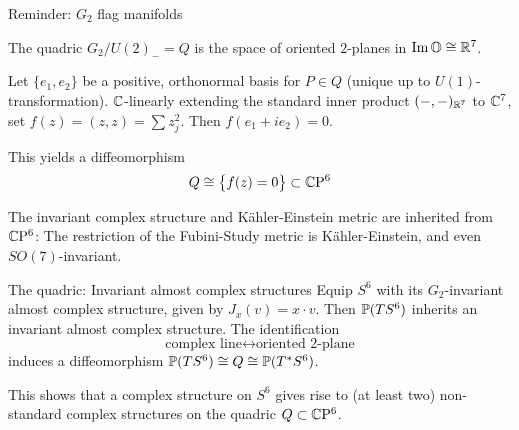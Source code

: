 \documentclass[11pt,parskip]{beamer}
\begin{document}
\begin{frame}{Reminder: $G_2$ flag manifolds}
	\begin{figure}\centering
	\end{figure}
\end{frame}

\begin{frame}{The quadric}
	$G_2/U(2)_-=Q$ is the space of oriented $2$-planes in $\Im\O\cong \R^7$. \pause
	\medskip
	
	Let $\{e_1,e_2\}$ be a positive, orthonormal basis for $P\in Q$ (unique up to $U(1)$-transformation). $\C$-linearly extending the standard inner product $(-,-)_{\R^7}$ to $\C^7$, set $f(z)=(z,z)=\sum z_j^2$. Then $f(e_1+ie_2)=0$.\pause
	\bigskip
	
	This yields a diffeomorphism
	\begin{equation*}
		Q\cong \big\{f(z)=0\big\} \subset \CP^6
	\end{equation*}\pause 
	\medskip
	
	The invariant complex structure and K\"ahler-Einstein metric are inherited from $\CP^6$: The restriction of the Fubini-Study metric is K\"ahler-Einstein, and even $SO(7)$-invariant. 
\end{frame}

\begin{frame}{The quadric: Invariant almost complex structures}
	Equip $S^6$ with its $G_2$-invariant almost complex structure, given by $J_x(v)=x \cdot v$. Then $\P(TS^6)$ inherits an invariant almost complex structure. \pause The identification
	\begin{equation*}
		\text{complex line} \longleftrightarrow \text{oriented 2-plane}
	\end{equation*}
	induces a diffeomorphism $\P(TS^6)\cong Q \cong \P(T^*S^6)$. \pause 
	\bigskip
	
	\begin{rem}
		This shows that a complex structure on $S^6$ gives rise to (at least two) non-standard complex structures on the quadric $Q\subset \CP^6$.
	\end{rem}
\end{frame}
\end{document}
